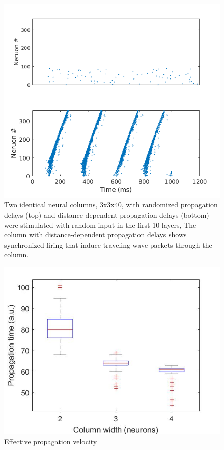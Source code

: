 \documentclass[a4paper,11pt]{article}
\begin{document}
\begin{figure}[p]
 \caption{Two identical neural columns, 3x3x40, with randomized propagation delays (top) and distance-dependent propagation delays (bottom) were stimulated with random input in the first 10 layers,
 The column with distance-dependent propagation delays shows synchronized firing that induce traveling wave packets through the column.}
 \label{fig:delaycompare}
 \centering
   \includegraphics[width=\textwidth]{fig/DelayCompare_RandInput}
\end{figure}

\begin{figure}[p]
 \caption{Effective propagation velocity}
 \centering
   \includegraphics[width=\textwidth]{fig/propagation_time}
\end{figure}

\clearpage
\printbibliography
\end{document}
